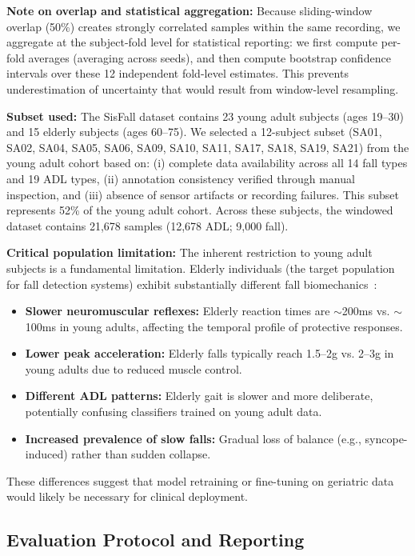 \documentclass{article}
\begin{document}
\textbf{Note on overlap and statistical aggregation:} Because sliding-window overlap (50\%) creates strongly correlated samples within the same recording, we aggregate at the subject-fold level for statistical reporting: we first compute per-fold averages (averaging across seeds), and then compute bootstrap confidence intervals over these 12 independent fold-level estimates. This prevents underestimation of uncertainty that would result from window-level resampling.

\textbf{Subset used:} The SisFall dataset contains 23 young adult subjects (ages 19--30) and 15 elderly subjects (ages 60--75). We selected a 12-subject subset (SA01, SA02, SA04, SA05, SA06, SA09, SA10, SA11, SA17, SA18, SA19, SA21) from the young adult cohort based on: (i) complete data availability across all 14 fall types and 19 ADL types, (ii) annotation consistency verified through manual inspection, and (iii) absence of sensor artifacts or recording failures. This subset represents 52\% of the young adult cohort. Across these subjects, the windowed dataset contains 21,678 samples (12,678 ADL; 9,000 fall).

\textbf{Critical population limitation:} The inherent restriction to young adult subjects is a fundamental limitation. Elderly individuals (the target population for fall detection systems) exhibit substantially different fall biomechanics~\cite{Bourke2007Threshold,Igual2013Challenges}:
\begin{itemize}
    \item \textbf{Slower neuromuscular reflexes:} Elderly reaction times are $\sim$200ms vs. $\sim$100ms in young adults, affecting the temporal profile of protective responses.
    \item \textbf{Lower peak acceleration:} Elderly falls typically reach 1.5--2g vs. 2--3g in young adults due to reduced muscle control.
    \item \textbf{Different ADL patterns:} Elderly gait is slower and more deliberate, potentially confusing classifiers trained on young adult data.
    \item \textbf{Increased prevalence of slow falls:} Gradual loss of balance (e.g., syncope-induced) rather than sudden collapse.
\end{itemize}
These differences suggest that model retraining or fine-tuning on geriatric data would likely be necessary for clinical deployment.

\subsection{Evaluation Protocol and Reporting}
\end{document}
